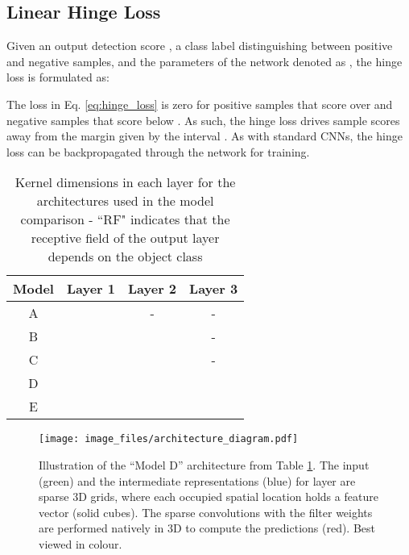\documentclass[letterpaper, 10 pt, conference]{tex_style/ieeeconf}
\begin{document}
\subsection{Linear Hinge Loss}
Given an output detection score , a class label  distinguishing between positive and negative samples, and the parameters of the network denoted as , the hinge loss is formulated as:


The loss in Eq. \ref{eq:hinge_loss} is zero for positive samples that score over  and negative samples that score below .
As such, the hinge loss drives sample scores away from the margin given by the interval .
As with standard CNNs, the  hinge loss can be backpropagated through the network for training.





\begin{table}
    \parbox[t]{\columnwidth}{
    \centering
    \caption{Kernel dimensions in each layer for the architectures used in the model comparison - ``RF" indicates that the receptive field of the output layer depends on the object class}
    \begin{tabularx}{0.32\textwidth}{c c c c}
        \toprule
        Model    & Layer 1   & Layer 2   & Layer 3   \\
        \midrule
        A   &    & - & - \\
        B   &  &   & - \\
        C   &  &   & - \\
        D   &  &  &   \\
        E   &  &  &   \\
        \bottomrule
    \end{tabularx}
    \label{tab:architectures}}
\end{table}

\begin{figure}
    \centering
    \texttt{[image: image\_files/architecture\_diagram.pdf]}
    \caption{Illustration of the ``Model D'' architecture from Table \ref{tab:architectures}. The input  (green) and the intermediate representations  (blue) for layer  are sparse 3D grids, where each occupied spatial location holds a feature vector (solid cubes). The sparse convolutions with the filter weights  are performed natively in 3D to compute the predictions (red). Best viewed in colour.}
    \label{fig:architecture_diagram}
\end{figure}
\end{document}
